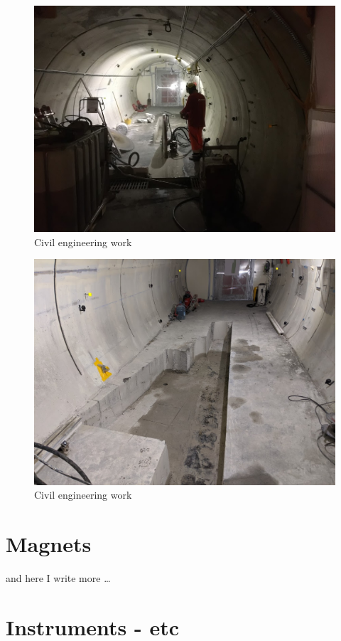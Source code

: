 \begin{figure}[htbp!] 
\centering    
\includegraphics[width=1.0\textwidth]{ChapterFaser/Figs/Raster/CEworks.JPG}
\caption[CE work]{Civil engineering work}
\label{fig:CEwork}
\end{figure}

\begin{figure}[htbp!] 
\centering    
\includegraphics[width=1.0\textwidth]{ChapterFaser/Figs/Raster/CEworks1.JPG}
\caption[CE work 1]{Civil engineering work}
\label{fig:CEwork1}
\end{figure}



\section{Magnets}
and here I write more \dots
\section{Instruments - etc}
